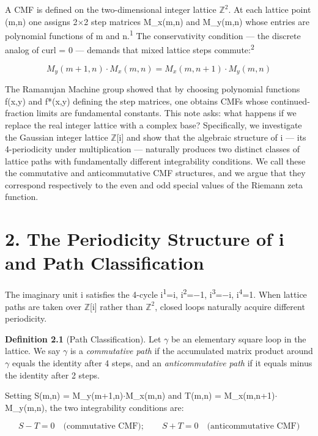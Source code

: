 \documentclass[11pt]{article}
\begin{document}
A CMF is defined on the two-dimensional integer lattice
\(\mathbb{Z}^{2}\). At each lattice point (m,n) one assigns 2\(\times\)2
step matrices M\_x(m,n) and M\_y(m,n) whose entries are polynomial
functions of m and n.\textsuperscript{1} The conservativity condition
--- the discrete analog of curl = 0 --- demands that mixed lattice steps
commute:\textsuperscript{2}

\[M_y(m+1,n) \cdot M_x(m,n) = M_x(m,n+1) \cdot M_y(m,n)\]

The Ramanujan Machine group showed that by choosing polynomial functions
f(x,y) and f*(x,y) defining the step matrices, one obtains CMFs whose
continued-fraction limits are fundamental constants. This note asks:
what happens if we replace the real integer lattice with a complex base?
Specifically, we investigate the Gaussian integer lattice
\(\mathbb{Z}\){[}i{]} and show that the algebraic structure of i --- its
4-periodicity under multiplication --- naturally produces two distinct
classes of lattice paths with fundamentally different integrability
conditions. We call these the commutative and anticommutative CMF
structures, and we argue that they correspond respectively to the even
and odd special values of the Riemann zeta function.

\hypertarget{the-periodicity-structure-of-i-and-path-classification}{%
\section{2. The Periodicity Structure of i and Path
Classification}\label{the-periodicity-structure-of-i-and-path-classification}}

The imaginary unit i satisfies the 4-cycle i\textsuperscript{1}=i,
i\textsuperscript{2}=−1, i\textsuperscript{3}=−i,
i\textsuperscript{4}=1. When lattice paths are taken over
\(\mathbb{Z}\){[}i{]} rather than \(\mathbb{Z}^{2}\), closed loops
naturally acquire different periodicity.

\textbf{Definition 2.1} (Path Classification). Let \(\gamma\) be an
elementary square loop in the lattice. We say \(\gamma\) is a
\emph{commutative path} if the accumulated matrix product around
\(\gamma\) equals the identity after 4 steps, and an
\emph{anticommutative path} if it equals minus the identity after 2
steps.

Setting S(m,n) = M\_y(m+1,n)\(\cdot\)M\_x(m,n) and T(m,n) =
M\_x(m,n+1)\(\cdot\)M\_y(m,n), the two integrability conditions are:

\[S - T = 0 \quad \text{(commutative CMF)}; \qquad S + T = 0 \quad \text{(anticommutative CMF)}\]
\end{document}
